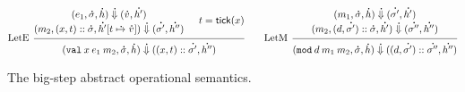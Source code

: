 \documentclass{article}
\theoremstyle{definition}
\newcommand*{\cons}{::}
\newcommand*{\A}[1]{\overset{{\,_{\mbox{\Large .}}}}{#1}}
\newcommand*{\modid}{d}
\newcommand*{\ctx}{\sigma}
\newcommand*{\mem}{h}
\newcommand*{\tick}{\mathsf{tick}}
\newcommand*{\Lete}{\mathtt{val}}
\newcommand*{\Letm}{\mathtt{mod}}
\begin{document}
\begin{figure}[h!]
  \[
    \begin{prooftree}
      \hypo{
        \begin{matrix}
          (e_{1}, \A\ctx, \A\mem)
          \A\Downarrow
          (\A{v}, \A{\mem'}) \\
          (m_{2}, (x, t)\cons \A\ctx, \A{\mem'}[t\A\mapsto\A{v}])
          \A\Downarrow
          (\A{\ctx'}, \A{\mem''})
        \end{matrix}
      }
      \hypo{
        \begin{matrix}
          t=\tick(x)
        \end{matrix}
      }
      \infer[left label=LetE]2{
      (\Lete\:x\:e_1\:m_2, \A\ctx, \A\mem)
      \A\Downarrow
      ((x,t)\cons\A{\ctx'}, \A{\mem''})
      }
    \end{prooftree}\qquad
    \begin{prooftree}
      \hypo{
        \begin{matrix}
          (m_{1}, \A{\ctx}, \A{\mem})
          \A\Downarrow
          (\A{\ctx'}, \A{\mem'}) \\
          (m_{2}, (\modid, \A{\ctx'})\cons \A\ctx, \A{\mem'})
          \A\Downarrow
          (\A{\ctx''}, \A{\mem''})
        \end{matrix}
      }
      \infer[left label=LetM]1{
      (\Letm\:\modid\:m_{1}\:m_{2}, \A\ctx, \A\mem)
      \A\Downarrow
      ((\modid,\A{\ctx'})\cons\A{\ctx''}, \A{\mem''})
      }
    \end{prooftree}
  \]
  \caption{The big-step abstract operational semantics.}
  \label{fig:abseval}
\end{figure}
\end{document}
